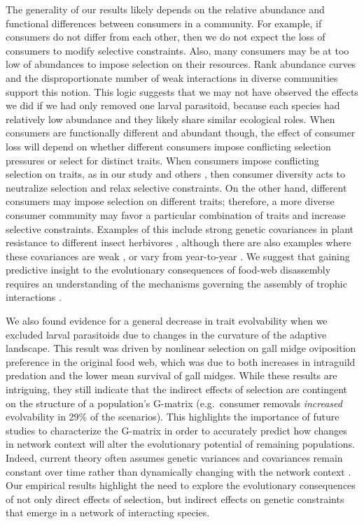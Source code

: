 \documentclass[11pt,]{article}
\begin{document}
The generality of our results likely depends on the relative abundance
and functional differences between consumers in a community. For
example, if consumers do not differ from each other, then we do not
expect the loss of consumers to modify selective constraints. Also, many
consumers may be at too low of abundances to impose selection on their
resources. Rank abundance curves \citep{Preston1948} and the
disproportionate number of weak interactions in diverse communities
\citep{Paine1992} support this notion. This logic suggests that we may
not have observed the effects we did if we had only removed one larval
parasitoid, because each species had relatively low abundance
\citep{Barbour2016} and they likely share similar ecological roles. When
consumers are functionally different and abundant though, the effect of
consumer loss will depend on whether different consumers impose
conflicting selection pressures or select for distinct traits. When
consumers impose conflicting selection on traits, as in our study and
others \citep{Weis1985, Abrahamson1997, Start2016, Start2018}, then
consumer diversity acts to neutralize selection and relax selective
constraints. On the other hand, different consumers may impose selection
on different traits; therefore, a more diverse consumer community may
favor a particular combination of traits and increase selective
constraints. Examples of this include strong genetic covariances in
plant resistance to different insect herbivores
\citep{Maddox1990, Wise2007, Wise2013}, although there are also examples
where these covariances are weak \citep{Roche1997, Barbour2015}, or vary
from year-to-year \citep{Johnson2007}. We suggest that gaining
predictive insight to the evolutionary consequences of food-web
disassembly requires an understanding of the mechanisms governing the
assembly of trophic interactions \citep{Bascompte2009}.

We also found evidence for a general decrease in trait evolvability when
we excluded larval parasitoids due to changes in the curvature of the
adaptive landscape. This result was driven by nonlinear selection on
gall midge oviposition preference in the original food web, which was
due to both increases in intraguild predation and the lower mean
survival of gall midges. While these results are intriguing, they still
indicate that the indirect effects of selection are contingent on the
structure of a population's G-matrix (e.g.~consumer removals
\emph{increased} evolvability in 29\% of the scenarios). This highlights
the importance of future studies to characterize the G-matrix in order
to accurately predict how changes in network context will alter the
evolutionary potential of remaining populations. Indeed, current theory
often assumes genetic variances and covariances remain constant over
time rather than dynamically changing with the network context
\citep{McPeek2017, Guimaraes2017}. Our empirical results highlight the
need to explore the evolutionary consequences of not only direct effects
of selection, but indirect effects on genetic constraints that emerge in
a network of interacting species.
\end{document}
